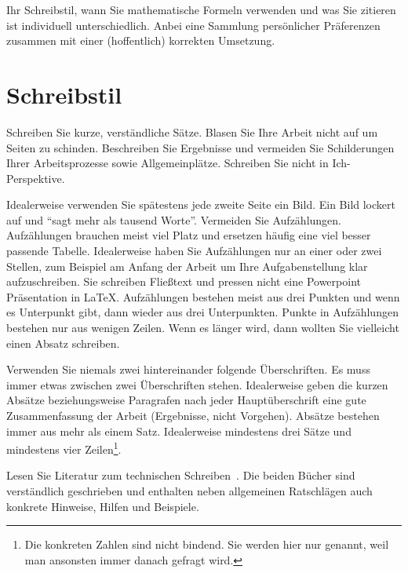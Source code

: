 \documentclass[11pt,a4paper]{report}
\begin{document}
Ihr Schreibstil, wann Sie mathematische Formeln verwenden
und was Sie zitieren ist individuell unterschiedlich.
Anbei eine Sammlung persönlicher Präferenzen zusammen mit 
einer (hoffentlich) korrekten Umsetzung.


\section{Schreibstil} \label{sec:schreibstil}

Schreiben Sie kurze, verständliche Sätze.
Blasen Sie Ihre Arbeit nicht auf um Seiten zu schinden.
Beschreiben Sie Ergebnisse und vermeiden Sie Schilderungen
Ihrer Arbeitsprozesse sowie Allgemeinplätze. 
Schreiben Sie nicht in Ich-Perspektive.

Idealerweise verwenden Sie spätestens jede zweite Seite ein Bild. 
Ein Bild lockert auf und "`sagt mehr als tausend Worte"'.
Vermeiden Sie Aufzählungen. 
Aufzählungen brauchen meist viel Platz und ersetzen häufig 
eine viel besser passende Tabelle. 
Idealerweise haben Sie Aufzählungen nur an einer oder
zwei Stellen, zum Beispiel am Anfang der Arbeit um Ihre
Aufgabenstellung klar aufzuschreiben. 
Sie schreiben Fließtext und pressen nicht eine Powerpoint
Präsentation in \LaTeX.
Aufzählungen bestehen meist aus drei Punkten und wenn 
es Unterpunkt gibt, dann wieder aus drei Unterpunkten.
Punkte in Aufzählungen bestehen nur aus wenigen Zeilen.
Wenn es länger wird, dann wollten Sie vielleicht einen
Absatz schreiben.

Verwenden Sie niemals zwei hintereinander folgende Überschriften.
Es muss immer etwas zwischen zwei Überschriften stehen. 
Idealerweise geben die kurzen Absätze beziehungsweise Paragrafen 
nach jeder Hauptüberschrift eine gute Zusammenfassung der Arbeit 
(Ergebnisse, nicht Vorgehen).
Absätze bestehen immer aus mehr als einem Satz. 
Idealerweise mindestens drei Sätze und mindestens vier 
Zeilen\footnote{
Die konkreten Zahlen sind nicht bindend. 
Sie werden hier nur genannt, weil man ansonsten immer 
danach gefragt wird. 
}.

Lesen Sie Literatur zum technischen Schreiben~\cite{gockel,rechenberg}.
Die beiden Bücher sind verständlich geschrieben und enthalten
neben allgemeinen Ratschlägen auch konkrete Hinweise, Hilfen und
Beispiele.
\end{document}
